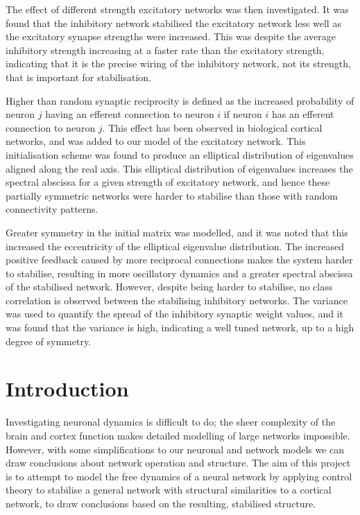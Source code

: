 \documentclass[12pt, a4paper]{article}
\begin{document}
The effect of different strength excitatory networks was then investigated.  It was found that the inhibitory network stabilised the excitatory network less well as the excitatory synapse strengths were increased.  This was despite the average inhibitory strength increasing at a faster rate than the excitatory strength, indicating that it is the precise wiring of the inhibitory network, not its strength, that is important for stabilisation. 

Higher than random synaptic reciprocity is defined as the increased probability of neuron $j$ having an efferent connection to neuron $i$ if neuron $i$ has an efferent connection to neuron $j$. This effect has been observed in biological cortical networks, and was added to our model of the excitatory network.  This initialisation scheme was found to produce an elliptical distribution of eigenvalues aligned along the real axis.  This elliptical distribution of eigenvalues increases the spectral abscissa for a given strength of excitatory network, and hence these partially symmetric networks were harder to stabilise than those with random connectivity patterns.  

Greater symmetry in the initial matrix was modelled, and it was noted that this increased the eccentricity of the elliptical eigenvalue distribution.  The increased positive feedback caused by more reciprocal connections makes the system harder to stabilise, resulting in more oscillatory dynamics and a greater spectral abscissa of the stabilised network.  However, despite being harder to stabilise, no class correlation is observed between the stabilising inhibitory networks.  The variance was used to quantify the spread of the inhibitory synaptic weight values, and it was found that the variance is high, indicating a well tuned network, up to a high degree of symmetry. 


\pagebreak
\thispagestyle{empty}
\tableofcontents

\pagebreak
{}
\section{Introduction}

Investigating neuronal dynamics is difficult to do; the sheer complexity of the brain and cortex function makes detailed modelling of large networks impossible.  However, with some simplifications to our neuronal and network models we can draw conclusions about network operation and structure.  The aim of this project is to attempt to model the free dynamics of a neural network by applying control theory to stabilise a general network with structural similarities to a cortical network, to draw conclusions based on the resulting, stabilised structure.
\end{document}
